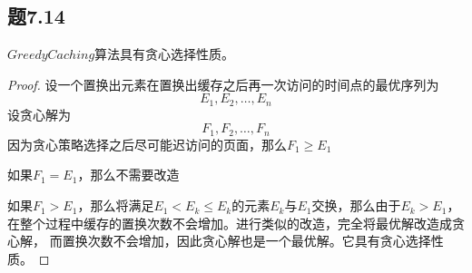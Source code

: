 \documentclass[a4paper,twoside]{article}
\begin{document}
\begin{spacing}{1.2}
\section{题7.14}

$GreedyCaching$算法具有贪心选择性质。
\begin{proof}
	设一个置换出元素在置换出缓存之后再一次访问的时间点的最优序列为
	\[
		E_1,E_2,\ldots,E_n
	\]
	设贪心解为
	\[
		F_1,F_2,\ldots,F_n
	\]
	因为贪心策略选择之后尽可能迟访问的页面，那么$F_1\ge E_1$

	如果$F_1=E_1$，那么不需要改造

	如果$F_1>E_1$，那么将满足$E_1<E_k\le E_k$的元素$E_k$与$E_1$交换，那么由于$E_k>E_1$，
	在整个过程中缓存的置换次数不会增加。进行类似的改造，完全将最优解改造成贪心解，
	而置换次数不会增加，因此贪心解也是一个最优解。它具有贪心选择性质。
\end{proof}

\end{spacing}
\end{document}

